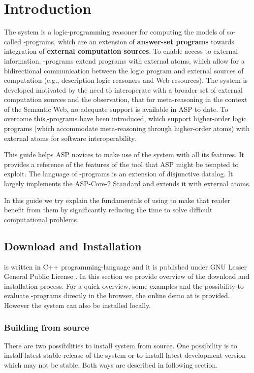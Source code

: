 \documentclass[14pt,a4paper, titlepage]{article}
\begin{document}
\section{Introduction} %
The \dlvhex{} system is a logic-programming reasoner for computing the models of so-called \hex{}-programs, which are an extension of \textbf{answer-set programs} towards integration of \textbf{external computation sources}. To enable access to external information, \hex{}-programs extend programs with external atoms, which allow for a bidirectional communication between the logic program and external sources of computation (e.g., description logic reasoners and Web resources)\cite{extatoms}. The system is developed motivated by the need to interoperate with a broader set of external computation sources and the observation, that for meta-reasoning in the context of the Semantic Web, no adequate support is available in ASP to date. To overcome this,\hex{}-programs have been introduced, which support higher-order logic programs (which accommodate meta-reasoning through higher-order atoms) with external atoms for software interoperability.

This guide helps ASP novices to make use of the system with all its features. It provides a reference of the features of the tool that ASP might be tempted to exploit. The language of \hex{}-programs is an extension of disjunctive datalog. It largely implements the ASP-Core-2 Standard \cite{ref} and extends it with external atoms. 

In this guide we try explain the fundamentals of using \dlvhex{} to make that reader benefit from them by significantly reducing the time to solve difficult computational problems. 


\subsection{Download and Installation}
\dlvhex{} is written in C++ programming-language and it is published under GNU Lesser General Public License \cite{licnc}. In this section we provide overview of the download and installation process. For a quick overview, some examples and the possibility to evaluate \hex{}-programs directly in the browser, the online demo at \cite{onlinedemo} is provided. However the system can also be installed locally. 
\subsubsection{Building from source}
There are two possibilities to install \dlvhex{} system from source. One possibility is to install latest stable release of the system or to install latest development version which may not be stable. Both ways are described in following section.  
\end{document}
